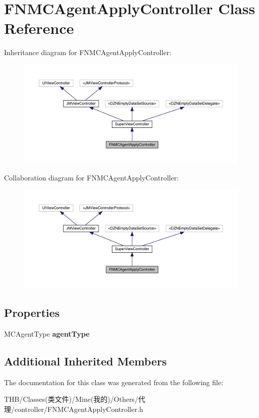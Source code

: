 \hypertarget{interface_f_n_m_c_agent_apply_controller}{}\section{F\+N\+M\+C\+Agent\+Apply\+Controller Class Reference}
\label{interface_f_n_m_c_agent_apply_controller}


Inheritance diagram for F\+N\+M\+C\+Agent\+Apply\+Controller\+:\nopagebreak
\begin{figure}[H]
\begin{center}
\leavevmode
\includegraphics[width=350pt]{interface_f_n_m_c_agent_apply_controller__inherit__graph}
\end{center}
\end{figure}


Collaboration diagram for F\+N\+M\+C\+Agent\+Apply\+Controller\+:\nopagebreak
\begin{figure}[H]
\begin{center}
\leavevmode
\includegraphics[width=350pt]{interface_f_n_m_c_agent_apply_controller__coll__graph}
\end{center}
\end{figure}
\subsection*{Properties}
\begin{DoxyCompactItemize}
\item 
\mbox{\label{interface_f_n_m_c_agent_apply_controller_a8a42911a42e0bf1941ba3250b218a350}} 
M\+C\+Agent\+Type {\bfseries agent\+Type}
\end{DoxyCompactItemize}
\subsection*{Additional Inherited Members}


The documentation for this class was generated from the following file\+:\begin{DoxyCompactItemize}
\item 
T\+H\+B/\+Classes(类文件)/\+Mine(我的)/\+Others/代理/controller/F\+N\+M\+C\+Agent\+Apply\+Controller.\+h\end{DoxyCompactItemize}
